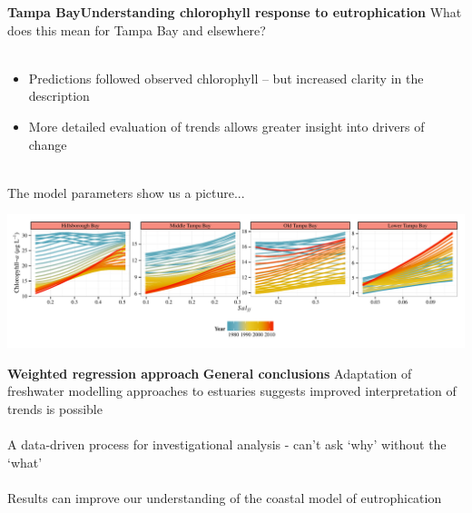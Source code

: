 \documentclass[serif]{beamer}\usepackage[]{graphicx}\usepackage[]{color}
\begin{document}
\begin{frame}{\textbf{Tampa Bay}}{\textbf{Understanding chlorophyll response to eutrophication}}
What does this mean for Tampa Bay and elsewhere?\\~\\
\begin{itemize}
\item Predictions followed observed chlorophyll -- but increased clarity in the description
\item More detailed evaluation of trends allows greater insight into drivers of change\\~\\
\end{itemize}
The model parameters show us a picture...
\centerline{\includegraphics[width = \textwidth]{fig/title_plo.pdf}}
\end{frame}

\begin{frame}{\textbf{Weighted regression approach}}{\textbf{ General conclusions}}
Adaptation of freshwater modelling approaches to estuaries suggests improved interpretation of trends is possible\\~\\
A data-driven process for investigational analysis - can't ask `why' without the `what'\\~\\
Results can improve our understanding of the coastal model of eutrophication
\begin{center}
\end{center}
\end{frame}
\end{document}

